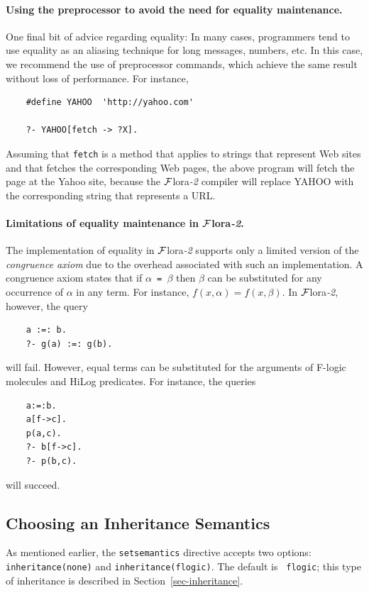 \documentclass[11pt]{article}
\newcommand{\FLORA}{{\mbox{\sc ${\cal F}${lora}\rm\emph{-2}}}\xspace}
\begin{document}
\paragraph{Using the preprocessor to avoid the need for equality maintenance.}
One final bit of advice regarding equality: In many cases, programmers tend to use
equality as an aliasing technique for long messages, numbers, etc. In this
case, we recommend the use of preprocessor commands, which achieve the same
result without loss of performance. For instance,

\begin{verbatim}
    #define YAHOO  'http://yahoo.com'  

    ?- YAHOO[fetch -> ?X].
\end{verbatim}
\noindent
Assuming that {\tt fetch} is a method that applies to strings that
represent Web sites and that fetches the corresponding Web pages, the above
program will fetch the page at the Yahoo site, because the \FLORA compiler will
replace YAHOO with the corresponding string that represents a URL.

\paragraph{Limitations of equality maintenance in \FLORA.}
The implementation of equality in \FLORA supports only a limited
version of the
\emph{congruence axiom} due to the overhead associated with such an
implementation. A congruence axiom states that if {\tt $\alpha$ = $\beta$}
then {\tt $\beta$} can be substituted for any occurrence of $\alpha$ in any
term. For instance, $f(x,\alpha) = f(x,\beta)$. In \FLORA, however, the query
\begin{verbatim}
    a :=: b.
    ?- g(a) :=: g(b).
\end{verbatim}
will fail. However,
equal terms can be substituted for the arguments of
F-logic molecules and HiLog predicates. For instance, the queries
\begin{verbatim}
    a:=:b.
    a[f->c].
    p(a,c).
    ?- b[f->c].  
    ?- p(b,c).
\end{verbatim}
will succeed.


\subsection{Choosing an Inheritance Semantics}\label{sec-inheritance-directive}

As mentioned earlier, the {\tt setsemantics} directive accepts two options:
{\tt inheritance(none)} and {\tt inheritance(flogic)}.  The default is {\tt
  flogic}; this type of inheritance is described in
Section~\ref{sec-inheritance}.
\end{document}
